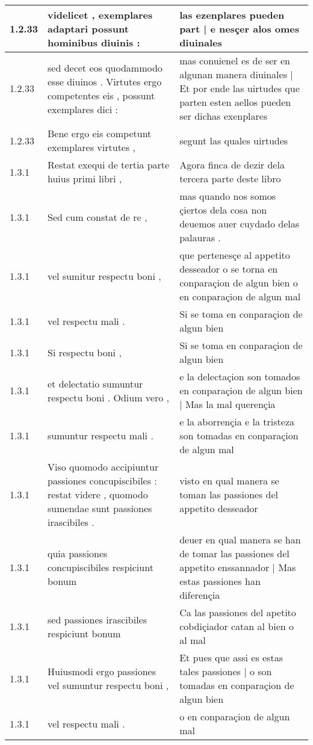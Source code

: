 \begin{tabular}{|p{1cm}|p{6.5cm}|p{6.5cm}|}
1.2.33 & videlicet , exemplares adaptari possunt hominibus diuinis : & las ezenplares pueden part | e nesçer alos omes diuinales \\\hline
1.2.33 & sed decet eos quodammodo esse diuinos . Virtutes ergo competentes eis , possunt exemplares dici : & mas conuienel es de ser en algunan manera diuinales | Et por ende las uirtudes que parten esten aellos pueden ser dichas exenplares \\\hline
1.2.33 & Bene ergo eis competunt exemplares virtutes , & segunt las quales uirtudes \\\hline
1.3.1 & Restat exequi de tertia parte huius primi libri , & Agora finca de dezir dela tercera parte deste libro \\\hline
1.3.1 & Sed cum constat de re , & mas quando nos somos çiertos dela cosa non deuemos auer cuydado delas palauras . \\\hline
1.3.1 & vel sumitur respectu boni , & que pertenesçe al appetito desseador o se torna en conparaçion de algun bien o en conparaçion de algun mal \\\hline
1.3.1 & vel respectu mali . & Si se toma en conparaçion de algun bien \\\hline
1.3.1 & Si respectu boni , & Si se toma en conparaçion de algun bien \\\hline
1.3.1 & et delectatio sumuntur respectu boni . Odium vero , & e la delectaçion son tomados en conparaçion de algun bien | Mas la mal querençia \\\hline
1.3.1 & sumuntur respectu mali . & e la aborrençia e la tristeza son tomadas en conparaçion de algun mal \\\hline
1.3.1 & Viso quomodo accipiuntur passiones concupiscibiles : restat videre , quomodo sumendae sunt passiones irascibiles . & visto en qual manera se toman las passiones del appetito desseador \\\hline
1.3.1 & quia passiones concupiscibiles respiciunt bonum & deuer en qual manera se han de tomar las passiones del appetito enssannador | Mas estas passiones han diferençia \\\hline
1.3.1 & sed passiones irascibiles respiciunt bonum & Ca las passiones del apetito cobdiçiador catan al bien o al mal \\\hline
1.3.1 & Huiusmodi ergo passiones vel sumuntur respectu boni , & Et pues que assi es estas tales passiones | o son tomadas en conparaçion de algun bien \\\hline
1.3.1 & vel respectu mali . & o en conparaçion de algun mal \\\hline

\end{tabular}
